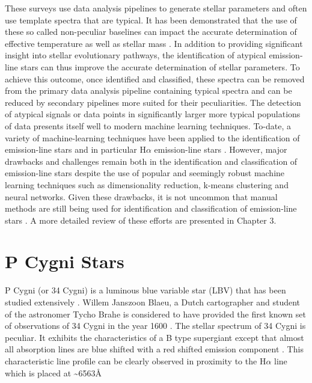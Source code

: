These surveys use data analysis pipelines to generate stellar parameters and often use template spectra that are typical. It has been demonstrated that the use of these so called non-peculiar baselines can impact the accurate determination of effective temperature \cite{cayrel2011halpha}\cite{amarsi2018effective}\cite{giribaldi2019accurate} as well as stellar mass \cite{ness2016spectroscopic}\cite{bergemann2016gaia}. In addition to providing significant insight into stellar evolutionary pathways, the identification of atypical emission-line stars can thus improve the accurate determination of stellar parameters. To achieve this outcome, once identified and classified, these spectra can be removed from the primary data analysis pipeline containing typical spectra and can be reduced by secondary pipelines more suited for their peculiarities. 
The detection of atypical signals or data points in significantly larger more typical populations of data presents itself well to modern machine learning techniques. To-date, a variety of machine-learning techniques have been applied to the identification of emission-line stars and in particular H$\alpha$ emission-line stars . However, major drawbacks and challenges remain both in the identification and classification of emission-line stars despite the use of popular and seemingly robust machine learning techniques such as dimensionality reduction, k-means clustering and neural networks. Given these drawbacks, it is not uncommon that manual methods are still being used for identification and classification of emission-line stars \cite{zhang2021catalog}. A more detailed review of these efforts are presented in Chapter 3. 



\section{P Cygni Stars}
P Cygni (or 34 Cygni) is a luminous blue variable star (LBV) that has been studied extensively \cite{1953PDAO....9....1B, hutchings1969expanding, elliott20225, underhill1966supergiants,mizumoto2018newly}. Willem Janszoon Blaeu, a Dutch cartographer and student of the astronomer Tycho Brahe is considered to have provided the first known set of observations of 34 Cygni in the year 1600 \cite{deGrootPCygni}. The stellar spectrum of 34 Cygni is peculiar. It exhibits the characteristics of a B type supergiant except that almost all absorption lines are blue shifted with a red shifted emission component \cite{hutchings1969expanding}. This characteristic line profile can be clearly observed in proximity to the H$\alpha$ line which is placed at \textasciitilde 6563\r{A} \cite{zhang2021catalog,traven2015gaia}

